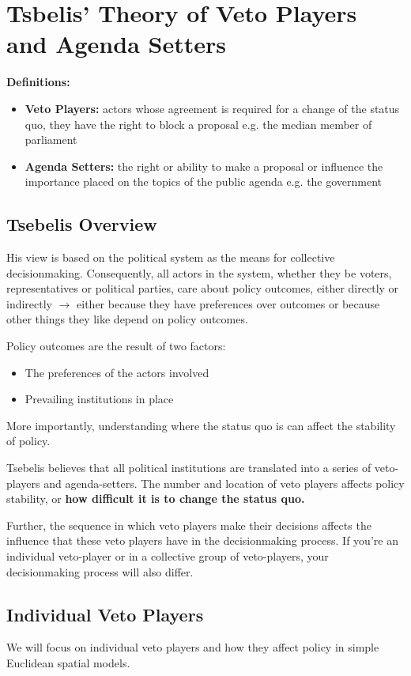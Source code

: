 \documentclass[12pt, letterpaper]{article}
\begin{document}
\section{Tsbelis' Theory of Veto Players and Agenda Setters}
\textbf{Definitions:}
\begin{itemize}
	\item \textbf{Veto Players:} actors whose agreement is required for a change of the status quo, they have the right to block a proposal e.g. the median member of parliament
	\item \textbf{Agenda Setters:} the right or ability to make a proposal or influence the importance placed on the topics of the public agenda e.g. the government
\end{itemize}

\subsection{Tsebelis Overview}
His view is based on the political system as the means for collective decisionmaking. Consequently, all actors in the system, whether they be voters, representatives or political parties, care about policy outcomes, either directly or indirectly $\rightarrow$ either because they have preferences over outcomes or because other things they like depend on policy outcomes.

Policy outcomes are the result of two factors:
\begin{itemize}
	\item The preferences of the actors involved
	\item Prevailing institutions in place
\end{itemize}
More importantly, understanding where the status quo is can affect the stability of policy.

Tsebelis believes that all political institutions are translated into a series of veto-players and agenda-setters. The number and location of veto players affects policy stability, or \textbf{how difficult it is to change the status quo.}

Further, the sequence in which veto players make their decisions affects the influence that these veto players have in the decisionmaking process. If you're an individual veto-player or in a collective group of veto-players, your decisionmaking process will also differ.

\subsection{Individual Veto Players}
We will focus on individual veto players and how they affect policy in simple Euclidean spatial models.
\end{document}
